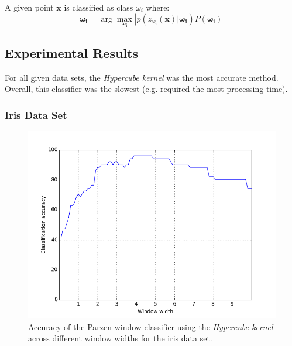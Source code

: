 \documentclass{article}
\numberwithin{figure}{section}
\newcommand{\bx}{\mathbf{x}}
\newcommand{\imgwidth}{.8\textwidth}
\begin{document}
A given point $\bx$ is classified as class $\omega_i$ where: 
$$\mathbf{\omega_i} = \arg\max_{\mathbf{\omega_i}} \left| p(z_{\omega_i}(\bx)|\mathbf{\omega_i}) P(\mathbf{\omega_i}) \right|$$

\subsection{Experimental Results}
For all given data sets, the \emph{Hypercube kernel} was the most accurate method. Overall, this classifier was the slowest (e.g. required the most processing time).

\subsubsection{Iris Data Set}

\begin{figure}[H]
\centering
\includegraphics[width=\imgwidth]{p_box_iris}
\caption{Accuracy of the Parzen window classifier using the \emph{Hypercube kernel} across different window widths for the iris data set.}
\label{pb_iris}
\end{figure}
\end{document}
